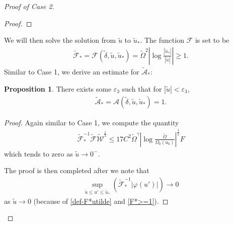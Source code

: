 \documentclass[11pt,reqno]{amsart}
\theoremstyle{definition}
\newtheorem{proposition}{Proposition}[section]
\numberwithin{equation}{section}
\renewcommand{\L}{\mathbb{L}}
\renewcommand{\H}{\mathbb{H}}
\newcommand{\tdelta}{\widetilde{\delta}}
\newcommand{\tOmega}{\widetilde{\Omega}}
\newcommand{\tu}{\widetilde{u}}
\def\nablas{\mbox{$\nabla \mkern -13mu /$ }}
\begin{document}
\begin{proof}[Proof of Case 2]
\begin{proof}
 \end{proof}
We will then solve the solution from $\tu$ to $\tu_*$. The function $\mathscr{F}$ is set to be
\begin{align}\label{def-F*utilde}
\widetilde{\mathscr{F}}_*=\mathscr{F}(\tdelta,\widetilde{u},\widetilde{u}_*)=\widetilde{\Omega}^2\left|\log\frac{|\widetilde{u}_*|}{|\widetilde{u}|}\right|\ge1.\end{align}
Similar to Case 1, we derive an estimate for $\widetilde{\mathcal{A}}_*$:
\begin{proposition}
There exists some $\varepsilon_3$ such that for $|\tu|<\varepsilon_3$, 
\begin{align}\label{estimate-Atilde*}
\widetilde{\mathcal{A}}_*=\mathcal{A}(\tdelta,\widetilde{u},\widetilde{u}_*)=1.
\end{align}
\end{proposition}
\begin{proof} Again similar to Case 1, we compute the quantity 
\begin{align*}
 \widetilde{\mathscr{F}}_*^{-1}\widetilde{\mathscr{F}}\widetilde{\mathscr{W}}^{\frac{1}{2}}\le17C^2\tOmega^\gamma \left|\log\frac{\tOmega}{\Omega_0(u_0)}\right|^{\frac{1}{2}}F
\end{align*}
which tends to zero as $\tu\to0^-$.
\begin{comment}
 \begin{align*}
&\left(\frac{\widetilde{\mathscr{F}}_{*}}{\widetilde{\mathscr{F}}}\right)^{-s_2}\left(\frac{\widetilde{\mathscr{E}}_{*}}{\widetilde{\mathscr{E}}}\right)^{-s_3}\left(\frac{\widetilde{\mathscr{W}}_{*}}{\widetilde{\mathscr{W}}}\right)^{-s_4}\\
\le&\left(F^{s_2}\cdot 18C^2\tOmega^\gamma\right)\cdot \left(\||u_0|(|u_0|\nablas)L\phi\|_{\L^2_{[0,\tdelta]}\H^4(u_0)}\left|\log\frac{|\tu|}{|u_0|}\right|^{\frac{1}{2}}\right)\cdot\left|\log\frac{\tOmega}{\Omega_0(u_0)}\right|\to0
\end{align*}
where we use again \eqref{condition-E}. In particular, this implies
\begin{align}\label{estimate-nablas5Lphi-utilde}
\||\tu|(|\tu|\nablas)L\phi\|_{\L^2_{[0,\tdelta]}\H^4(\tu)}\le\widetilde{\mathscr{F}}_*\widetilde{\mathcal{A}}_*.
\end{align}
\end{comment}
The proof is then completed after we note that
\begin{align*}
\sup_{\tu\le u'\le \tu_*}(\widetilde{\mathscr{F}}^{-1}_*|\varphi(u')|)\to0
\end{align*}
as $\tu\to0$ (because of \eqref{def-F*utilde} and \eqref{F*>=1}).
\end{proof}


\end{proof}
\end{document}
